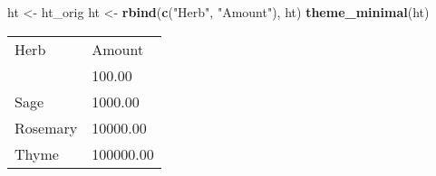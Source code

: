 \documentclass[]{article}
\newenvironment{Shaded}{\begin{snugshade}}{\end{snugshade}}
\newcommand{\KeywordTok}[1]{\textcolor[rgb]{0.13,0.29,0.53}{\textbf{{#1}}}}
\newcommand{\StringTok}[1]{\textcolor[rgb]{0.31,0.60,0.02}{{#1}}}
\newcommand{\NormalTok}[1]{{#1}}
\begin{document}
\begin{Shaded}
\begin{Highlighting}[]
\NormalTok{ht <-}\StringTok{ }\NormalTok{ht_orig}
\NormalTok{ht <-}\StringTok{ }\KeywordTok{rbind}\NormalTok{(}\KeywordTok{c}\NormalTok{(}\StringTok{"Herb"}\NormalTok{, }\StringTok{"Amount"}\NormalTok{), ht)}
\KeywordTok{theme_minimal}\NormalTok{(ht)}
\end{Highlighting}
\end{Shaded}

\begin{table}[h]
\begin{centering}\let\huxlen\relax
\newlength\huxlen
\begin{tabularx}{0.25\textwidth}{>{}X >{}X}
\multicolumn{1}{l|}{\rule{0pt}{\baselineskip+4pt}\hspace*{4pt}Herb\hspace*{4pt}\rule[-4pt]{0pt}{4pt}} & \multicolumn{1}{l}{\rule{0pt}{\baselineskip+4pt}\hspace*{4pt}Amount\hspace*{4pt}\rule[-4pt]{0pt}{4pt}} \tabularnewline[-0.5pt]
\hhline{>{\arrayrulecolor{black}}->{\arrayrulecolor{black}}-}
\arrayrulecolor{black}
\multicolumn{1}{l|}{\rule{0pt}{\baselineskip+4pt}\hspace*{4pt}Parsley\hspace*{4pt}\rule[-4pt]{0pt}{4pt}} & \multicolumn{1}{l}{\rule{0pt}{\baselineskip+4pt}\hspace*{4pt}100.00\hspace*{4pt}\rule[-4pt]{0pt}{4pt}} \tabularnewline[-0.5pt]
\multicolumn{1}{l|}{\rule{0pt}{\baselineskip+4pt}\hspace*{4pt}Sage\hspace*{4pt}\rule[-4pt]{0pt}{4pt}} & \multicolumn{1}{l}{\rule{0pt}{\baselineskip+4pt}\hspace*{4pt}1000.00\hspace*{4pt}\rule[-4pt]{0pt}{4pt}} \tabularnewline[-0.5pt]
\multicolumn{1}{l|}{\rule{0pt}{\baselineskip+4pt}\hspace*{4pt}Rosemary\hspace*{4pt}\rule[-4pt]{0pt}{4pt}} & \multicolumn{1}{l}{\rule{0pt}{\baselineskip+4pt}\hspace*{4pt}10000.00\hspace*{4pt}\rule[-4pt]{0pt}{4pt}} \tabularnewline[-0.5pt]
\multicolumn{1}{l|}{\rule{0pt}{\baselineskip+4pt}\hspace*{4pt}Thyme\hspace*{4pt}\rule[-4pt]{0pt}{4pt}} & \multicolumn{1}{l}{\rule{0pt}{\baselineskip+4pt}\hspace*{4pt}100000.00\hspace*{4pt}\rule[-4pt]{0pt}{4pt}} \tabularnewline[-0.5pt]
\end{tabularx}
\par\end{centering}
\end{table}
\end{document}
